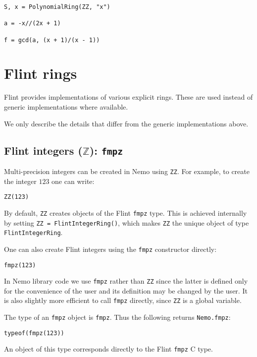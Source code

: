 \documentclass[a4paper,10pt]{article}
\newcommand{\Z}{\mathbb{Z}}
\newcommand{\code}{\lstinline}
\begin{document}
\begin{lstlisting}
S, x = PolynomialRing(ZZ, "x")

a = -x//(2x + 1)

f = gcd(a, (x + 1)/(x - 1))
\end{lstlisting}

\section{Flint rings}

Flint provides implementations of various explicit rings. These are used instead of generic
implementations where available.

We only describe the details that differ from the generic implementations above.

\subsection{Flint integers ($\Z$): \code{fmpz}}

Multi-precision integers can be created in Nemo using \code{ZZ}. For example, to create the integer
$123$ one can write:

\begin{lstlisting}
ZZ(123)
\end{lstlisting}

By default, \code{ZZ} creates objects of the Flint \code{fmpz} type. This is achieved internally by
setting \code{ZZ = FlintIntegerRing()}, which makes \code{ZZ} the unique object of type
\code{FlintIntegerRing}.

One can also create Flint integers using the \code{fmpz} constructor directly:

\begin{lstlisting}
fmpz(123)
\end{lstlisting}

In Nemo library code we use \code{fmpz} rather than \code{ZZ} since the latter is defined only for the
convenience of the user and its definition may be changed by the user. It is also slightly more
efficient to call \code{fmpz} directly, since \code{ZZ} is a global variable.

The type of an \code{fmpz} object is \code{fmpz}. Thus the following returns \code{Nemo.fmpz}:

\begin{lstlisting}
typeof(fmpz(123))
\end{lstlisting}

An object of this type corresponds directly to the Flint \code{fmpz} C type.
\end{document}
